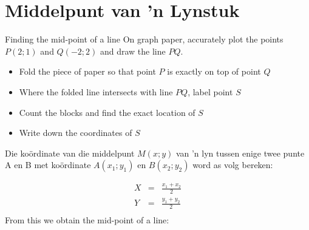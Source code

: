 \section{Middelpunt van ’n Lynstuk}
\begin{activity}{Finding the mid-point of a line}
On graph paper, accurately plot the points $P(2;1)$ and $Q(-2;2)$ and draw the line $PQ$.
\begin{itemize}
 \item Fold the piece of paper so that point $P$ is exactly on top of point $Q$
\item Where the folded line intersects with line $PQ$, label point $S$
\item Count the blocks and find the exact location of $S$
\item Write down the coordinates of $S$
\end{itemize}

\end{activity}


Die koördinate van die middelpunt $M(x;y)$ van ’n lyn tussen enige twee punte A en B met koördinate $A(x_1;y_1)$ en $B(x_2;y_2)$ word as volg bereken:

\setcounter{subfigure}{0}
\begin{figure}[H] %
\begin{center}
\end{center}
\end{figure}      

\begin{eqnarray*}
X & = & \frac{{x}_{1} + {x}_{2}}{2} \\ 
Y & = & \frac{{y}_{1} + {y}_{2}}{2} \\  
\end{eqnarray*}
From this we obtain the mid-point of a line:

